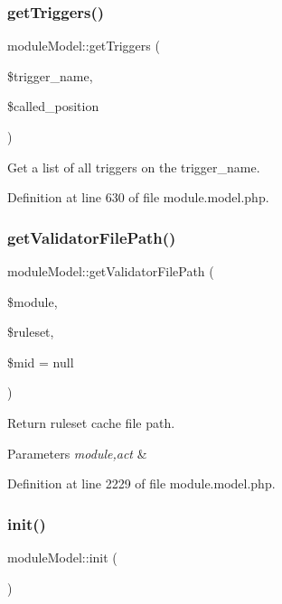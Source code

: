 \subsubsection{\texorpdfstring{get\+Triggers()}{getTriggers()}}
{\footnotesize\ttfamily module\+Model\+::get\+Triggers (\begin{DoxyParamCaption}\item[{}]{\$trigger\+\_\+name,  }\item[{}]{\$called\+\_\+position }\end{DoxyParamCaption})}



Get a list of all triggers on the trigger\+\_\+name. 



Definition at line 630 of file module.\+model.\+php.

\hypertarget{classmoduleModel_a240b4774ddaadc1ded08551120942ca3}{}\label{classmoduleModel_a240b4774ddaadc1ded08551120942ca3} 
\subsubsection{\texorpdfstring{get\+Validator\+File\+Path()}{getValidatorFilePath()}}
{\footnotesize\ttfamily module\+Model\+::get\+Validator\+File\+Path (\begin{DoxyParamCaption}\item[{}]{\$module,  }\item[{}]{\$ruleset,  }\item[{}]{\$mid = {\ttfamily null} }\end{DoxyParamCaption})}



Return ruleset cache file path. 


\begin{DoxyParams}{Parameters}
{\em module,act} & \\
\hline
\end{DoxyParams}


Definition at line 2229 of file module.\+model.\+php.

\hypertarget{classmoduleModel_a1d6fb4cdd3dd5e068e71cacc551f517c}{}\label{classmoduleModel_a1d6fb4cdd3dd5e068e71cacc551f517c} 
\subsubsection{\texorpdfstring{init()}{init()}}
{\footnotesize\ttfamily module\+Model\+::init (\begin{DoxyParamCaption}{ }\end{DoxyParamCaption})}



